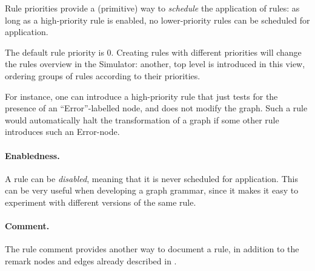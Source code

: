 Rule priorities provide a (primitive) way to
\emph{schedule} the application of rules: as long as a high-priority rule is
enabled, no lower-priority rules can be scheduled for application.

The default rule priority is 0. Creating rules with different priorities will
change the rules overview in the Simulator: another, top level is introduced in
this view, ordering groups of rules according to their priorities.

For instance, one can introduce a high-priority rule that just tests for the
presence of an ``\textsf{Error}''-labelled node, and does not modify the
graph. Such a rule would automatically halt the transformation of a graph if
some other rule introduces such an \textsf{Error}-node.

\paragraph{Enabledness.}

A rule can be \emph{disabled}, meaning that it is never scheduled for
application. This can be very useful when developing a graph grammar, since it
makes it easy to experiment with different versions of the same rule.

\paragraph{Comment.}

The rule comment provides another way to document a rule, in addition to the
remark nodes and edges already described in .
